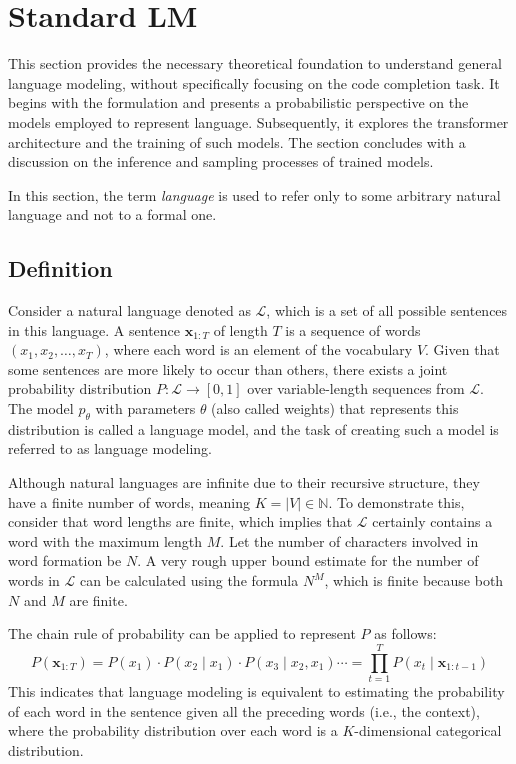 \section{Standard LM}

This section provides the necessary theoretical foundation to understand general language modeling, without specifically focusing on the code completion task. It begins with the formulation and presents a probabilistic perspective on the models employed to represent language. Subsequently, it explores the transformer architecture and the training of such models. The section concludes with a discussion on the inference and sampling processes of trained models.

In this section, the term \textit{language} is used to refer only to some arbitrary natural language and not to a formal one.

\subsection{Definition}

Consider a natural language denoted as \(\mathcal{L}\), which is a set of all possible sentences in this language. A sentence \(\bm{x}_{1:T}\) of length \(T\) is a sequence of words \((x_1, x_2, \ldots, x_T)\), where each word is an element of the vocabulary \(V\). Given that some sentences are more likely to occur than others, there exists a joint probability distribution \(P : \mathcal{L} \to [0, 1]\) over variable-length sequences from \(\mathcal{L}\). The model \(p_\theta\) with parameters \(\theta\) (also called weights) that represents this distribution is called a language model, and the task of creating such a model is referred to as language modeling.

Although natural languages are infinite due to their recursive structure, they have a finite number of words, meaning \(K = |V| \in \mathbb{N}\). To demonstrate this, consider that word lengths are finite, which implies that \(\mathcal{L}\) certainly contains a word with the maximum length \(M\). Let the number of characters involved in word formation be \(N\). A very rough upper bound estimate for the number of words in \(\mathcal{L}\) can be calculated using the formula \(N^M\), which is finite because both \(N\) and \(M\) are finite.

The chain rule of probability can be applied to represent \(P\) as follows:
\begin{equation}\label{eq:probability-chain-rule}
    P(\bm{x}_{1:T}) = P(x_1) \cdot P(x_2 \mid x_1) \cdot P(x_3 \mid x_2, x_1) \cdots = \prod_{t=1}^{T}P(x_t \mid \bm{x}_{1:t-1})
\end{equation} 
This indicates that language modeling is equivalent to estimating the probability of each word in the sentence given all the preceding words (i.e., the context), where the probability distribution over each word is a \(K\)-dimensional categorical distribution.

